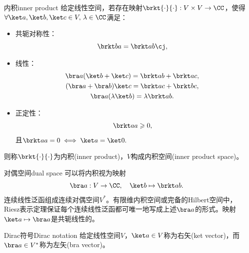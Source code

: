 \begin{definition}
	{内积}{inner product}
	给定线性空间，若存在映射$\brkt{\cdot}{\cdot}:V\times V\to\CC$，使得$\forall\ket a,\ket b,\ket c\in V,\,\lambda\in\CC$满足：
	\begin{itemize}
		\item 共轭对称性：
		\begin{equation}
			\brkt ba=\brkt ab\cj,
		\end{equation}
		\item 线性：
		\begin{subequations}
			\begin{gather}
				\bra a(\ket b+\ket c)=\brkt ab+\brkt ac, \\
				(\bra a+\bra b)\ket c=\brkt ac+\brkt bc, \\
				\bra a(\lambda\ket b)=\lambda\brkt ab.
			\end{gather}
		\end{subequations}
		\item 正定性：
		\begin{equation}
			\brkt aa\geqslant0,
		\end{equation}
		且$\brkt aa=0\iff\ket a=\ket 0.$
	\end{itemize}
	则称$\brkt{\cdot}{\cdot}$为内积(inner product)，$V$构成内积空间(inner product space)。
\end{definition}

\begin{definition}
	{对偶空间}{dual space}
	可以将内积视为映射
	\begin{equation}
		\bra a:V\to\CC,\quad\ket b\mapsto\brkt ab.
	\end{equation}
	连续线性泛函组成连续对偶空间$V^*$。有限维内积空间或完备的Hilbert空间中，Riesz表示定理保证每个连续线性泛函都可唯一地写成上述$\bra a$的形式。映射$\ket a\mapsto\bra a$是共轭线性的。
\end{definition}

\begin{definition}
	{Dirac符号}{Dirac notation}
	给定线性空间$V$，$\ket a\in V$称为右矢(ket vector)，而$\bra a\in V^*$称为左矢(bra vector)。
\end{definition}

